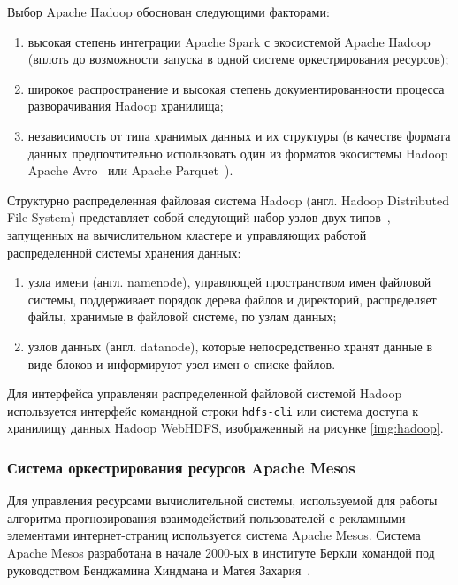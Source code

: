 Выбор Apache Hadoop обоснован следующими факторами:
\begin{enumerate}
    \item высокая степень интеграции Apache Spark с экосистемой Apache Hadoop (вплоть до
    возможности запуска в одной системе оркестрирования ресурсов);
    \item широкое распространение и высокая степень документированности процесса
    разворачивания Hadoop хранилища;
    \item независимость от типа хранимых данных и их структуры (в качестве формата данных
    предпочтительно использовать один из форматов экосистемы Hadoop Apache Avro~\autocite{impl:avro} 
    или Apache Parquet~\autocite{impl:parquet}).
\end{enumerate}

Структурно распределенная файловая система Hadoop  (англ. Hadoop Distributed File System) представляет
собой следующий набор узлов двух типов~\autocite{impl:hadoop-architecture}, запущенных на вычислительном кластере
и управляющих работой распределенной системы хранения данных:
\begin{enumerate}
    \item узла имени (англ. namenode), управлющей пространством имен файловой системы, поддерживает порядок
    дерева файлов и директорий, распределяет файлы, хранимые в файловой системе, по узлам данных;
    \item узлов данных (англ. datanode), которые непосредственно хранят данные в виде блоков и информируют
    узел имен о списке файлов.
\end{enumerate}

Для интерфейса управленяи распределенной файловой системой Hadoop используется интерфейс командной строки
\texttt{hdfs-cli} или система доступа к хранилищу данных Hadoop WebHDFS, изображенный на рисунке \ref{img:hadoop}.


\subsubsection{Система оркестрирования ресурсов Apache Mesos}
Для управления ресурсами вычислительной системы, используемой для работы алгоритма 
прогнозирования взаимодействий пользователей с рекламными элементами интернет-страниц
используется система Apache Mesos. Система Apache Mesos разработана в начале 2000-ых в институте
Беркли командой под руководством Бенджамина Хиндмана и Матея Захария~\autocite{impl:mesos-article}.

